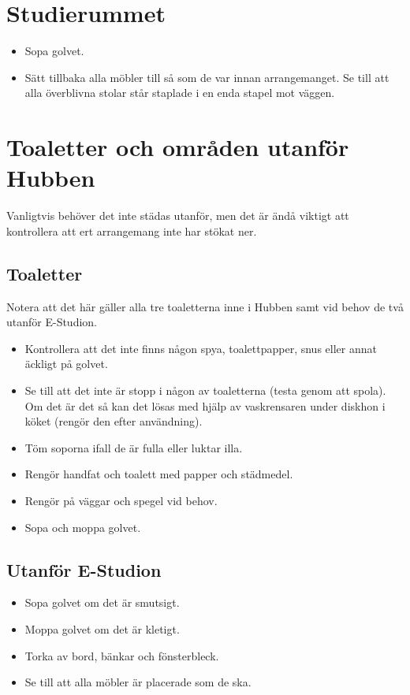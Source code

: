 \section{Studierummet}
\begin{itemize}
    \item Sopa golvet.
    \item Sätt tillbaka alla möbler till så som de var innan arrangemanget. Se till att alla överblivna stolar står staplade i en enda stapel mot väggen.
\end{itemize}

\section{Toaletter och områden utanför Hubben}
Vanligtvis behöver det inte städas utanför, men det är ändå viktigt att kontrollera att ert arrangemang inte har stökat ner.
\subsection{Toaletter}
Notera att det här gäller alla tre toaletterna inne i Hubben samt vid behov de två utanför E-Studion.
\begin{itemize}
    \item Kontrollera att det inte finns någon spya, toalettpapper, snus eller annat äckligt på golvet.
    \item Se till att det inte är stopp i någon av toaletterna (testa genom att spola). Om det är det så kan det lösas med hjälp av vaskrensaren under diskhon i köket (rengör den efter användning).
    \item Töm soporna ifall de är fulla eller luktar illa.
    \item Rengör handfat och toalett med papper och städmedel.
    \item Rengör på väggar och spegel vid behov.  
    \item Sopa och moppa golvet.
\end{itemize}

\subsection{Utanför E-Studion}
\begin{itemize}
    \item Sopa golvet om det är smutsigt.
    \item Moppa golvet om det är kletigt.
    \item Torka av bord, bänkar och fönsterbleck.
    \item Se till att alla möbler är placerade som de ska.
\end{itemize}

